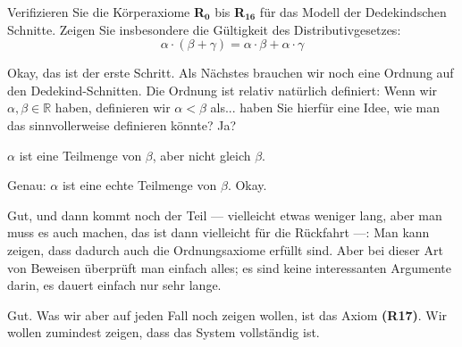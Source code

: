 \begin{math-stroke}

\begin{exercise}
Verifizieren Sie die Körperaxiome \textbf{R$_{\mathbf{0}}$} bis \textbf{R$_{\mathbf{16}}$} für das Modell der Dedekindschen Schnitte. Zeigen Sie insbesondere die Gültigkeit des Distributivgesetzes:
\[ \alpha \cdot (\beta + \gamma) = \alpha \cdot \beta + \alpha \cdot \gamma \]
\end{exercise}
\end{math-stroke}

\begin{spoken-clean}[01:12:45 - 01:14:00]
Okay, das ist der erste Schritt. Als Nächstes brauchen wir noch eine Ordnung auf den Dedekind-Schnitten. Die Ordnung ist relativ natürlich definiert: Wenn wir $\alpha, \beta \in \mathbb{R}$ haben, definieren wir $\alpha < \beta$ als... haben Sie hierfür eine Idee, wie man das sinnvollerweise definieren könnte? Ja?
\end{spoken-clean}

\begin{student-interaction}
$\alpha$ ist eine Teilmenge von $\beta$, aber nicht gleich $\beta$.
\end{student-interaction}

\begin{spoken-clean}[01:14:00 - 01:15:30]
Genau: $\alpha$ ist eine echte Teilmenge von $\beta$. Okay.

Gut, und dann kommt noch der Teil --- vielleicht etwas weniger lang, aber man muss es auch machen, das ist dann vielleicht für die Rückfahrt ---: Man kann zeigen, dass dadurch auch die Ordnungsaxiome erfüllt sind. Aber bei dieser Art von Beweisen überprüft man einfach alles; es sind keine interessanten Argumente darin, es dauert einfach nur sehr lange.

Gut. Was wir aber auf jeden Fall noch zeigen wollen, ist das Axiom \textbf{(R17)}. Wir wollen zumindest zeigen, dass das System vollständig ist.
\end{spoken-clean}

